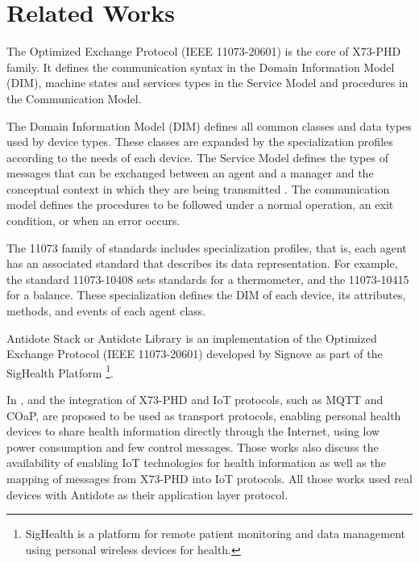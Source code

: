 \section{Related Works}\label{relatedworks}

The Optimized Exchange Protocol (IEEE 11073-20601) is the core of X73-PHD family. It defines the communication syntax in the Domain Information Model (DIM), machine states and services types in the Service Model and procedures in the Communication Model. 

The Domain Information Model (DIM) defines all common classes and data types used by device types. These classes are expanded by the specialization profiles according to the needs of each device. The Service Model defines the types of messages that can be exchanged between an agent and a manager and the conceptual context in which they are being transmitted \cite{b17}. The communication model defines the procedures to be followed under a normal operation, an exit condition, or when an error occurs.

The 11073 family of standards includes specialization profiles, that is, each agent has an associated standard that describes its data representation. For example, the standard 11073-10408 sets standards for a thermometer, and the 11073-10415 for a balance. These specialization defines the DIM of each device, its attributes, methods, and events of each agent class.

Antidote Stack or Antidote Library is an implementation of the Optimized Exchange Protocol (IEEE 11073-20601) developed by Signove as part of the SigHealth Platform \footnote{SigHealth is a platform for remote patient monitoring and data management using personal wireless devices for health.}. 

In \cite{b7},\cite{b8} and \cite{b9} the integration of X73-PHD and IoT protocols, such as MQTT and COaP, are proposed to be used as transport protocols, enabling personal health devices to share health information directly through the Internet, using low power consumption and few control messages. Those works also discuss the availability of enabling IoT technologies for health information as well as the mapping of messages from X73-PHD into IoT protocols. All those works used real devices with Antidote as their application layer protocol.

